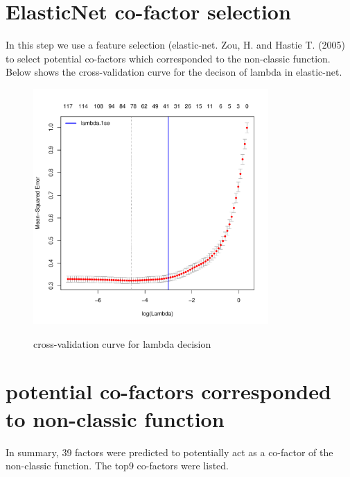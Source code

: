 \documentclass[11pt,a4paper]{article}
\begin{document}
\section{ElasticNet co-factor selection}
In this step we use a feature selection (elastic-net. Zou, H. and Hastie T. (2005) to select potential co-factors which corresponded to the non-classic function. Below shows the cross-validation curve for the decison of lambda in elastic-net.  
\begin{figure}[h]
        \caption{cross-validation curve for lambda decision} \label{fig:profileunion}
        \setlength{\abovecaptionskip}{0pt}
        \setlength{\belowcaptionskip}{10pt}
        \centering
        {\includegraphics[width=0.8\textwidth]{test4_elnet_lambdaSelection.pdf}}
\end{figure}

\newpage
\newpage
\section{potential co-factors corresponded to non-classic function}
In summary, 39 factors were predicted to potentially act as a co-factor of the non-classic function. The top9 co-factors were listed.
\end{document}
